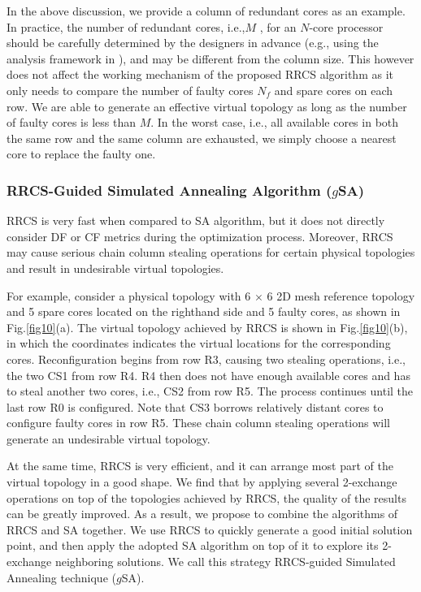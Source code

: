 In the above discussion, we provide a column of redundant cores as an example. In practice, the number of redundant cores, i.e.,$M$ , for an $N$-core processor should be carefully determined by the designers in advance (e.g., using the analysis framework in \cite{pan2007framework}), and may be different from the column size. This however does not affect the working mechanism of the proposed RRCS algorithm as it only needs to compare the number of faulty cores   $N_{f}$  and spare cores on each row. We are able to generate an effective virtual topology as long as the number of faulty cores is less than $M$. In the worst case, i.e., all available cores in both the same row and the same column are exhausted, we simply choose a nearest core to replace the faulty one.

\subsubsection{RRCS-Guided Simulated Annealing Algorithm ($g$SA)}
RRCS is very fast when compared to SA algorithm, but it does not directly consider DF or CF metrics during the optimization process. Moreover, RRCS may cause serious chain column stealing operations for certain physical topologies and result in undesirable virtual topologies.

For example, consider a physical topology with 6 $\times$ 6 2D mesh reference topology and 5 spare cores located on the righthand side and 5 faulty cores, as shown in Fig.\ref{fig10}(a). The virtual topology achieved by RRCS is shown in Fig.\ref{fig10}(b), in which the coordinates indicates the virtual locations for the corresponding cores. Reconfiguration begins from row R3, causing two stealing operations, i.e., the two CS1 from row R4. R4 then does not have enough available cores and has to steal another two cores, i.e., CS2 from row R5. The process continues until the last row R0 is configured. Note that CS3 borrows relatively distant cores to configure faulty cores in row R5. These chain column stealing operations will generate an undesirable virtual topology.


At the same time, RRCS is very efficient, and it can arrange most part of the virtual topology in a good shape. We find that by applying several 2-exchange operations on top of the topologies achieved by RRCS, the quality of the results can be greatly improved. As a result, we propose to combine the algorithms of RRCS and SA together. We use RRCS to quickly generate a good initial solution point, and then apply the adopted SA algorithm on top of it to explore its 2-exchange neighboring solutions. We call this strategy RRCS-guided Simulated Annealing technique ($g$SA).

